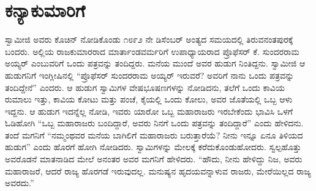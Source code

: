 
\chapter{ಕನ್ಯಾಕುಮಾರಿಗೆ }

 ಸ್ವಾಮೀಜಿ ಅವರು ಕೊಚಿನ್ ನೋಡಿಕೊಂಡು ೧೮೯೨ ನೇ ಡಿಸೆಂಬರ್ ಅಂತ್ಯದ ಸಮಯದಲ್ಲಿ ತಿರುವನಂತಪುರಕ್ಕೆ ಬಂದರು. ಅಲ್ಲಿಯ ರಾಜಕುಮಾರರಾದ ಮಾರ್ತಾಂಡವರ್ಮರಿಗೆ ಉಪಾಧ್ಯಾಯರಾದ ಪ್ರೊಫೆಸರ್ ಕೆ. ಸುಂದರರಾಮ ಅಯ್ಯರ್ ಎಂಬುವರಿಗೆ ಒಂದು ಪತ್ರವನ್ನು ತಂದಿದ್ದರು. ಮನೆಯ ಮುಂದೆ ಅವರ ಹುಡುಗ ನಿಂತಿದ್ದನು. ಸ್ವಾಮೀಜಿ ಆ ಹುಡುಗನಿಗೆ ಇಂಗ್ಲೀಷಿನಲ್ಲಿ “ಪ್ರೊಫೆಸರ್ ಸುಂದರರಾಮ ಅಯ್ಯರ್ ಇರುವರೆ? ಅವರಿಗೆ ನಾನು ಒಂದು ಪತ್ರವನ್ನು ತಂದಿದ್ದೇನೆ” ಎಂದರು. ಆ ಹುಡುಗ ಸ್ವಾಮಿಗಳ ವೇಷಭೂಷಣಗಳನ್ನು ನೋಡಿದನು, ತಲೆಗೆ ಒಂದು ಕಾವಿಯ ರುಮಾಲು ಇತ್ತು, ಕಾವಿಯ ಕೋಟು ಮತ್ತು ಪಂಚೆ, ಕೈಯಲ್ಲಿ ಒಂದು ಕೋಲು, ಅವರ ಜೊತೆಯಲ್ಲಿ ಒಬ್ಬ ಆಳು ಇದ್ದನು. ಆ ಹುಡುಗ ಇದನ್ನೆಲ್ಲ ನೋಡಿ, ಇವರು ಯಾರೋ ಒಬ್ಬ ಮಹಾರಾಜರು ಇರಬೇಕೆಂದು ಭಾವಿಸಿ ಒಳಗೆ ಓಡಿಹೋಗಿ “ಒಬ್ಬ ಮಹಾರಾಜರು ಬಂದಿದ್ದಾರೆ, ಅವರು ನಿನಗೆ ಒಂದು ಪತ್ರವನ್ನು ತಂದಿದ್ದಾರೆ” ಎಂದು ಹೇಳಿದನು. ತಂದೆ ಮಗನಿಗೆ “ನಮ್ಮಂಥವರ ಮನೆಯ ಬಾಗಿಲಿಗೆ ಮಹಾರಾಜರು ಬರುತ್ತಾರೆಯೆ? ನೀನು ಇನ್ನೂ ಏನೂ ತಿಳಿಯದ ಹುಡುಗ” ಎಂದು ಹೊರಗೆ ಹೋಗಿ ನೋಡಿದರು. ಸ್ವಾಮಿಗಳನ್ನು ಮೇಲಕ್ಕೆ ಕರೆದುಕೊಂಡುಹೋದರು. ಸ್ವಲ್ಪಹೊತ್ತು ಅವರೊಡನೆ ಮಾತನಾಡಿದ ಮೇಲೆ ಅನಂತರ ಅವರ ಮಗನಿಗೆ ಹೇಳಿದರು. “ಹೌದು, ನೀನು ಹೇಳಿದ್ದು ನಿಜ, ಅವರು ಮಹಾರಾಜರೆ, ಆದರೆ ರಾಜ್ಯ ಹೊರಗಡೆ ಇರುವುದಲ್ಲ. ಮನುಷ್ಯನ ಹೃದಯವನ್ನಾಳುವ ರಾಜರು, ಮೇರೆಯಿಲ್ಲದ ರಾಜ್ಯ ಅವರದು.” 

